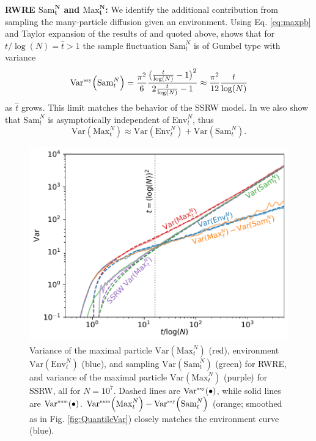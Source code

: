 \documentclass[%
 reprint,
 amsmath,amssymb,
 longbibliography,
 aps,
prl
]{revtex4-1}
\newcommand{\var}[1]{\mathrm{Var}\left(#1\right)}
\newcommand{\varasy}[1]{\mathrm{Var}^{\textrm{\tiny{asy}}}\!\left(#1\right)}
\newcommand{\varnum}[1]{\mathrm{Var}^{\textrm{\tiny{num}}}\!\left(#1\right)}
\def\maxnt{\mathrm{Max}^{N}_t}
\def\envnt{\mathrm{Env}^{N}_t}
\def\snt{\mathrm{Sam}^{N}_t}
\begin{document}
\noindent\textbf{RWRE $\boldsymbol{\snt}$ and $\boldsymbol{\maxnt}$:}
We identify the additional contribution from sampling the many-particle diffusion given an environment.
Using Eq. \eqref{eq:maxpb} and Taylor expansion of the results of \cite{barraquandRandomwalkBetadistributedRandom2017a} and \cite{barraquandModerateDeviationsDiffusion2020a} quoted above, \cite{SeeSupplementalMaterial} shows that for $t/\log(N)=\hat{t}>1$ the sample fluctuation $\snt$ is of Gumbel type with variance
%
\begin{equation}\label{eq:varnst}
\varasy{\snt} = \frac{\pi^2}{6} \frac{\big(\frac{t}{\log(N)} -1\big)^2}{2\frac{t}{\log(N)} -1}\approx \frac{\pi^2}{12} \frac{t}{\log(N)}
\end{equation}
as $\hat{t}$ grows. This limit matches the behavior of the SSRW model. In \cite{SeeSupplementalMaterial} we also show that $\snt$ is asymptotically independent of $\envnt$, thus
\begin{equation}\label{eq:varadd}
\var{\maxnt} \approx \var{\envnt} + \var{\snt}.
\end{equation}

\begin{figure}[h]
  \includegraphics[width=\columnwidth]{MaxQuantComp.pdf}
  \caption{Variance of the maximal particle $\var{\maxnt}$ (red), environment $\var{\envnt}$ (blue), and sampling $\var{\snt}$ (green) for RWRE, and variance of the maximal particle  $\var{\maxnt}$ (purple) for SSRW, all for $N=10^7$. Dashed lines are $\varasy{\bullet}$, while solid lines are $\varnum{\bullet}$. $\varnum{\maxnt} - \varasy{\snt}$ (orange; smoothed as in Fig. \ref{fig:QuantileVar}) closely matches the environment curve (blue).}
  \label{fig:RWREAssembly}
\end{figure}
\end{document}
